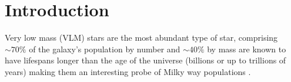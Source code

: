 \documentclass[modern]{aastex62}
\begin{document}
 
\section{Introduction} \label{sec:intro}

Very low mass (VLM) stars are the most abundant type of star, comprising $\sim 70 \%$ of the galaxy's population by number \citep{Bochanski:2010} and $\sim 40 \%$ by mass are known to have lifespans longer than the age of the universe (billions or up to trillions of years) \citep{Laughlin:1997} making them an interesting probe of Milky way populations \citep{Bochanski:2007}.
\end{document}

